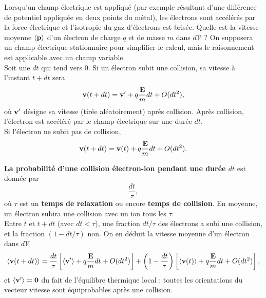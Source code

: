 \documentclass[11pt,a4paper]{report}
\begin{document}
Lorsqu'un champ électrique est appliqué (par exemple résultant d'une différence de potentiel appliquée en deux points du métal), les électrons sont accélérés par la force électrique et l'isotropie du gaz d'électrons est brisée. Quelle est la vitesse moyenne $\langle\bold{p}\rangle$ d'un électron de charge $q$ et de masse $m$ dans $d\mathcal{V}$ ? On supposera un champ électrique stationnaire pour simplifier le calcul, mais le raisonnement est applicable avec un champ variable.\\
	
Soit une $dt$ qui tend vers 0. Si un électron subit une collision, sa vitesse à l'instant $t + dt$ sera
\begin{equation}
	\bold{v}(t+dt) = \bold{v}' + q\frac{\bold{E}}{m}dt + O(dt^2),
\end{equation}
où $\bold{v}'$ désigne sa vitesse (tirée aléatoirement) après collision. Après collision, l'électron est accéléré par le champ électrique sur une durée $dt$.\\

Si l'électron ne subit pas de collision,
\begin{equation}
	\bold{v}(t+dt) = \bold{v}(t) + q\frac{\bold{E}}{m}dt + O(dt^2).\\
\end{equation}

\textbf{La probabilité d'une collision électron-ion pendant une durée $dt$} est donnée par
\begin{equation}
	\frac{dt}{\tau},
\end{equation}
où $\tau$ est un \textbf{temps de relaxation} ou encore \textbf{temps de collision}. En moyenne, un électron subira une collision avec un ion tous les $\tau$.\\

Entre $t$ et $t+dt$ (avec $dt < \tau $), une fraction $dt/\tau$ des électrons a subi une collision, et la fraction $(1 - dt/\tau)$ non. On en déduit la vitesse moyenne d'un électron dans $d\mathcal{V}$
\begin{equation}
	\langle\bold{v}(t+dt)\rangle = \frac{dt}{\tau} \left[\langle\bold{v}'\rangle + q\frac{\bold{E}}{m}dt + O(dt^2)\right] 
	+ \left(1 - \frac{dt}{\tau}\right) \left[\langle\bold{v}(t)\rangle + q\frac{\bold{E}}{m}dt + O(dt^2)\right],
\end{equation}
et $\langle\bold{v}'\rangle = \bold{0}$ du fait de l'équilibre thermique local : toutes les orientations du vecteur vitesse sont équiprobables après une collision.\\
\end{document}
